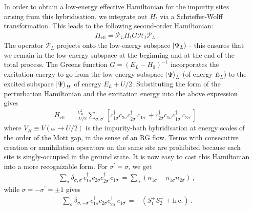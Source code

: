 In order to obtain a low-energy effective Hamiltonian for the impurity sites arising from this hybridisation, we integrate out \(H_t\) via a Schrieffer-Wolff transformation. This leads to the following second-order Hamiltonian:
\begin{equation}\begin{aligned}
	H_\text{eff} = \mathcal{P}_L H_t G\mathcal H_t \mathcal{P}_L~.
\end{aligned}\end{equation}
The operator \(\mathcal{P}_L\) projects onto the low-energy subspace \(\ket{\Psi_L}\) - this ensures that we remain in the low-energy subspace at the beginning and at the end of the total process. The Greens function \(G = (E_L - H_0)^{-1}\) incorporates the excitation energy to go from the low-energy subspace \(\ket{\Psi}_L\) (of energy \(E_L\)) to the excited subspace \(\ket{\Psi}_H\) of energy \(E_L + U/2\). Substituting the form of the perturbation Hamiltonian and the excitation energy into the above expression gives
\begin{equation}\begin{aligned}\label{effHam1}
	H_\text{eff} = \frac{V_H^2}{-U/2}\sum_{\sigma,\sigma^\prime} \left[c^\dagger_{1\sigma}c_{2\sigma}c^\dagger_{2\sigma^\prime}c_{1\sigma^\prime} + c^\dagger_{2\sigma}c_{1\sigma}c^\dagger_{1\sigma^\prime}c_{2\sigma^\prime}\right] ~.
\end{aligned}\end{equation}
where \(V_H \equiv V(\omega \to U/2)\) is the impurity-bath hybridisation at energy scales of the order of the Mott gap, in the sense of an RG flow. Terms with consecutive creation or annihilation operators on the same site are prohibited because each site is singly-occupied in the ground state. It is now easy to cast this Hamiltonian into a more recognizable form. For \(\sigma^\prime=\sigma\), we get
\begin{equation}\begin{aligned}
	\sum_{\sigma}\delta_{\sigma,\sigma^\prime}c^\dagger_{1\sigma}c_{2\sigma}c^\dagger_{2\sigma^\prime}c_{1\sigma^\prime} = \sum_\sigma \left(n_{1\sigma} - n_{1\sigma}n_{2\sigma}\right) ~,
\end{aligned}\end{equation}
while \(\sigma=-\sigma^\prime=\pm 1\) gives 
\begin{equation}\begin{aligned}
	\sum_{\sigma}\delta_{\sigma,-\sigma^\prime}c^\dagger_{1\sigma}c_{2\sigma}c^\dagger_{2\sigma^\prime}c_{1\sigma^\prime} = -\left(S_1^+ S_2^- + \text{h.c.}\right)~.
\end{aligned}\end{equation}
